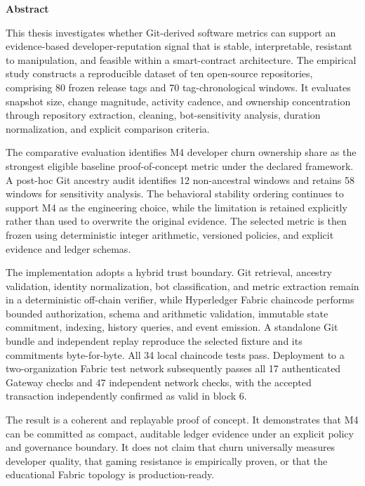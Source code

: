 
\begin{singlespace}
\begin{center}
\bfseries Abstract
\end{center}

This thesis investigates whether Git-derived software metrics can support an evidence-based developer-reputation signal that is stable, interpretable, resistant to manipulation, and feasible within a smart-contract architecture. The empirical study constructs a reproducible dataset of ten open-source repositories, comprising 80 frozen release tags and 70 tag-chronological windows. It evaluates snapshot size, change magnitude, activity cadence, and ownership concentration through repository extraction, cleaning, bot-sensitivity analysis, duration normalization, and explicit comparison criteria.

The comparative evaluation identifies M4 developer churn ownership share as the strongest eligible baseline proof-of-concept metric under the declared framework. A post-hoc Git ancestry audit identifies 12 non-ancestral windows and retains 58 windows for sensitivity analysis. The behavioral stability ordering continues to support M4 as the engineering choice, while the limitation is retained explicitly rather than used to overwrite the original evidence. The selected metric is then frozen using deterministic integer arithmetic, versioned policies, and explicit evidence and ledger schemas.

The implementation adopts a hybrid trust boundary. Git retrieval, ancestry validation, identity normalization, bot classification, and metric extraction remain in a deterministic off-chain verifier, while Hyperledger Fabric chaincode performs bounded authorization, schema and arithmetic validation, immutable state commitment, indexing, history queries, and event emission. A standalone Git bundle and independent replay reproduce the selected fixture and its commitments byte-for-byte. All 34 local chaincode tests pass. Deployment to a two-organization Fabric test network subsequently passes all 17 authenticated Gateway checks and 47 independent network checks, with the accepted transaction independently confirmed as valid in block 6.

The result is a coherent and replayable proof of concept. It demonstrates that M4 can be committed as compact, auditable ledger evidence under an explicit policy and governance boundary. It does not claim that churn universally measures developer quality, that gaming resistance is empirically proven, or that the educational Fabric topology is production-ready.
\end{singlespace}
